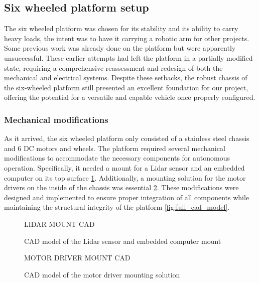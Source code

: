 \documentclass[11pt]{article}
\begin{document}
    
        \subsection{Six wheeled platform setup}

            The six wheeled platform was chosen for its stability and its ability to carry heavy loads, the intent was to have it carrying a robotic arm for other projects.
            Some previous work was already done on the platform but were apparently unsuccessful. These earlier attempts had left the platform in a partially modified state, requiring a comprehensive reassessment and redesign of both the mechanical and electrical systems. Despite these setbacks, the robust chassis of the six-wheeled platform still presented an excellent foundation for our project, offering the potential for a versatile and capable vehicle once properly configured.

            \subsubsection{Mechanical modifications}
            As it arrived, the six wheeled platform only consisted of a stainless steel chassis and 6 DC motors and wheels. The platform required several mechanical modifications to accommodate the necessary components for autonomous operation. Specifically, it needed a mount for a Lidar sensor and an embedded computer on its top surface \ref{fig:lidar_mount}. Additionally, a mounting solution for the motor drivers on the inside of the chassis was essential \ref{fig:motor_driver_mount}. These modifications were designed and implemented to ensure proper integration of all components while maintaining the structural integrity of the platform \ref{fig:full_cad_model}.

            \begin{figure}[htbp]
                \centering
                LIDAR MOUNT CAD
                \caption{CAD model of the Lidar sensor and embedded computer mount}
                \label{fig:lidar_mount}
            \end{figure}
            
            \begin{figure}[htbp]
                \centering
                MOTOR DRIVER MOUNT CAD
                \caption{CAD model of the motor driver mounting solution}
                \label{fig:motor_driver_mount}
            \end{figure}
            
\end{document}
